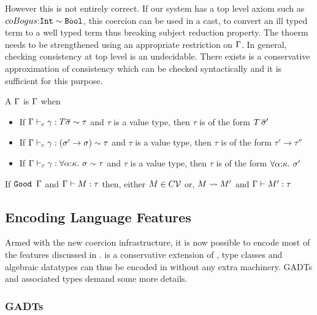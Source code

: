 \documentclass[manuscript,screen,nonacm]{acmart}
\begin{document}
However this is not entirely correct. If our system has a top level axiom such as $coBogus {:} \texttt{Int} \sim \texttt{Bool}$, this coercion can be used in a cast, to convert an ill typed term to a well typed term thus breaking subject reduction property. The thoerm needs to be strengthened using an appropriate restriction on $\TEnv$. In general, checking consistency at top level is an undecidable. There exists is a conservative approximation of consistency which can be checked syntactically and it is sufficient for this purpose.

\begin{definition}[\Good $\TEnv$]
  A $\TEnv$ is \Good $\TEnv$ when
  \begin{itemize}
  \item If $\Gamma \vdash_{c} \gamma : T \overline{\sigma} \sim \tau$ and $\tau$ is a value type, then $\tau$ is of the form $T\,\overline{\sigma}'$
  \item If $\Gamma \vdash_{c} \gamma : (\sigma' \to \sigma) \sim \tau$ and $\tau$ is a value type, then $\tau$ is of the form $\tau' \to \tau''$
  \item If $\Gamma \vdash_{c} \gamma : \forall\alpha{:}\kappa.~\sigma \sim \tau$ and $\tau$ is a value type, then $\tau$ is of the form $\forall\alpha{:}\kappa.~\sigma'$
  \end{itemize}
\end{definition}

\begin{theorem}\label{thm:progress}
  If $\texttt{Good }\Gamma$ and $\Gamma \vdash M : \tau$ then, either $M \in C\mathcal{V}$ or, $M \rightsquigarrow M'$ and
  $\Gamma \vdash M' : \tau$
\end{theorem}

\subsection{Encoding Language Features}

Armed with the new coercion infrastructure, it is now possible to encode most of the features discussed in . \SFC is a conservative extension of \SF, type classes and algebraic datatypes can thus be encoded in \SFC without any extra machinery. GADTs and associated types demand some more details.

\subsubsection{GADTs}
\end{document}

